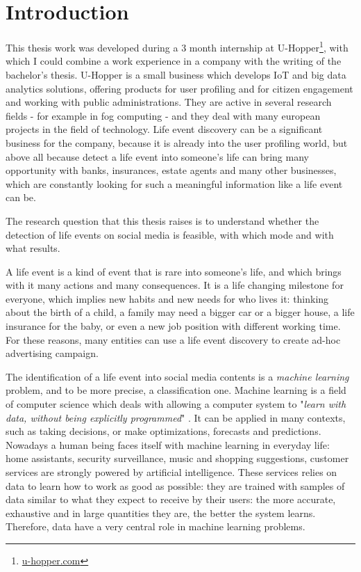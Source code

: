 \chapter{Introduction}
\label{cha:intro}

This thesis work was developed during a 3 month internship at U-Hopper\footnote{\url{u-hopper.com}}, with which I could combine a work experience in a company with the writing of the bachelor's thesis. U-Hopper is a small business which develops IoT and big data analytics solutions, offering products for user profiling and for citizen engagement and working with public administrations. They are active in several research fields - for example in fog computing - and they deal with many european projects in the field of technology. Life event discovery can be a significant business for the company, because it is already into the user profiling world, but above all because detect a life event into someone's life can bring many opportunity with banks, insurances, estate agents and many other businesses, which are constantly looking for such a meaningful information like a life event can be.

The research question that this thesis raises is to understand whether the detection of life events on social media is feasible, with which mode and with what results.

A life event is a kind of event that is rare into someone's life, and which brings with it many actions and many consequences. It is a life changing milestone for everyone, which implies new habits and new needs for who lives it: thinking about the birth of a child, a family may need a bigger car or a bigger house, a life insurance for the baby, or even a new job position with different working time. For these reasons, many entities can use a life event discovery to create ad-hoc advertising campaign. 

The identification of a life event into social media contents is a \emph{machine learning} problem, and to be more precise, a classification one. Machine learning is a field of computer science which deals with allowing a computer system to "\textit{learn with data, without being explicitly programmed}" \cite{samuel1959some}. It can be applied in many contexts, such as taking decisions, or make optimizations, forecasts and predictions. Nowadays a human being faces itself with machine learning in everyday life: home assistants, security surveillance, music and shopping suggestions, customer services are strongly powered by artificial intelligence. These services relies on data to learn how to work as good as possible: they are trained with samples of data similar to what they expect to receive by their users: the more accurate, exhaustive and in large quantities they are, the better the system learns. Therefore, data have a very central role in machine learning problems.


